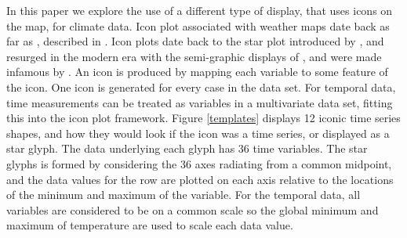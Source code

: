 \documentclass[oneside]{article}
\begin{document}

In this paper we explore the use of a different type of display, that uses icons on the map, for climate data.  Icon plot associated with weather maps date back as far as \citet{galton:weathermap}, described in \citet{friendlydenis:2001}. Icon plots date back to the star plot introduced by \citet{mayr:1877}, and resurged in the modern era with the semi-graphic displays of \citet{anderson:1960}, and were made infamous by \citep{chernoff:1973}. An icon is produced by mapping each variable to some feature of the icon. One icon is generated for every case in the data set. %
For temporal data, time measurements can be treated as variables in a multivariate data set, fitting this into the icon plot framework. Figure \ref{templates} displays 12 iconic time series shapes, and how they would look if the icon was a time series, or displayed as a star glyph. The data underlying each glyph has 36 time variables. The star glyphs is formed by considering the 36 axes radiating from a common midpoint, and the data values for the row are plotted on each axis relative to the locations of the minimum and maximum of the variable. For the temporal data, all variables are considered to be on a common scale so the global minimum and maximum of temperature are used to scale each data value. 
\end{document}
